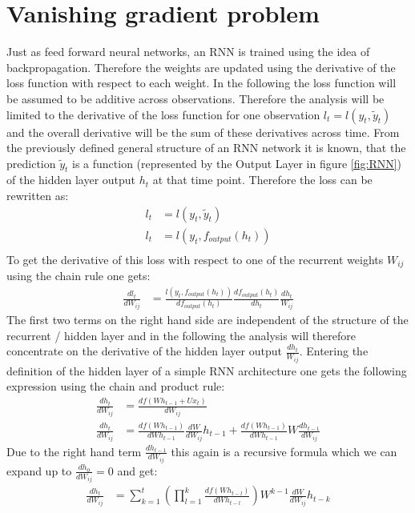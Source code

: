 \section{Vanishing gradient problem}
Just as feed forward neural networks, an RNN is trained using the idea of backpropagation. Therefore the weights are updated using the derivative of the loss function with respect to each weight. In the following the loss function will be assumed to be additive across observations. Therefore the analysis will be limited to the derivative of the loss function for one observation $l_t = l(y_t, \tilde{y}_t)$ and the overall derivative will be the sum of these derivatives across time. From the previously defined general structure of an RNN network it is known, that the prediction $\tilde{y}_t$ is a function (represented by the Output Layer in  figure \ref{fig:RNN}) of the hidden layer output $h_t$ at that time point. Therefore the loss can be rewritten as:
\begin{align*}
l_t &= l(y_t, \tilde{y}_t) \\
l_t &= l(y_t, f_{output}(h_t))\\
\end{align*}
To get the derivative of this loss with respect to one of the recurrent weights $W_{ij}$ using the chain rule one gets:
\begin{align*}
\frac{dl_t}{dW_{ij}} &= \frac{l(y_t, f_{output}(h_t))}{df_{output}(h_t)}\frac{df_{output}(h_t)}{dh_t}\frac{dh_t}{W_{ij}}
\end{align*}
The first two terms on the right hand side are independent of the structure of the recurrent / hidden layer and in the following the analysis will therefore concentrate on the derivative of the hidden layer output $\frac{dh_t}{W_{ij}}$.
Entering the definition of the hidden layer of a simple RNN architecture one gets the following expression using the chain and product rule:
\begin{align*}
\frac{dh_t}{dW_{ij}} &= \frac{df(Wh_{t-1} + Ux_t)}{dW_{ij}} \\
\frac{dh_t}{dW_{ij}} &= \frac{df(Wh_{t-1})}{dWh_{t-1}}\frac{dW}{dW_{ij}}h_{t-1} +\frac{df(Wh_{t-1})}{dWh_{t-1}} W\frac{dh_{t-1}}{dW_{ij}}
\end{align*}
Due to the right hand term $\frac{dh_{t-1}}{dW_{ij}}$ this again is a recursive formula which we can expand up to $ \frac{dh_{0}}{dW_{ij}} = 0$ and get:
\begin{align*}
\frac{dh_t}{dW_{ij}} &= \sum_{k = 1}^t( \prod_{l = 1}^k \frac{df(Wh_{t-l})}{dWh_{t-l}}) W^{k-1} \frac{dW}{dW_{ij}} h_{t-k}
\end{align*}
